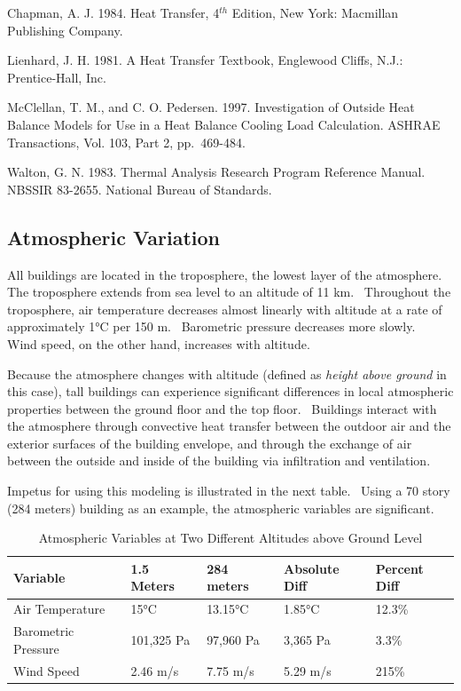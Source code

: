 Chapman, A. J. 1984. Heat Transfer, 4\(^{th}\) Edition, New York: Macmillan Publishing Company.

Lienhard, J. H. 1981. A Heat Transfer Textbook, Englewood Cliffs, N.J.: Prentice-Hall, Inc.

McClellan, T. M., and C. O. Pedersen. 1997. Investigation of Outside Heat Balance Models for Use in a Heat Balance Cooling Load Calculation. ASHRAE Transactions, Vol. 103, Part 2, pp.~469-484.

Walton, G. N. 1983. Thermal Analysis Research Program Reference Manual. NBSSIR 83-2655. National Bureau of Standards.

\subsection{Atmospheric Variation}\label{atmospheric-variation}

All buildings are located in the troposphere, the lowest layer of the atmosphere.~ The troposphere extends from sea level to an altitude of 11 km.~ Throughout the troposphere, air temperature decreases almost linearly with altitude at a rate of approximately 1°C per 150 m.~ Barometric pressure decreases more slowly.~ Wind speed, on the other hand, increases with altitude.

Because the atmosphere changes with altitude (defined as \emph{height above ground} in this case), tall buildings can experience significant differences in local atmospheric properties between the ground floor and the top floor. ~Buildings interact with the atmosphere through convective heat transfer between the outdoor air and the exterior surfaces of the building envelope, and through the exchange of air between the outside and inside of the building via infiltration and ventilation.

Impetus for using this modeling is illustrated in the next table.~ Using a 70 story (284 meters) building as an example, the atmospheric variables are significant.

\begin{longtable}[c]{@{}lllll@{}}
\caption{Atmospheric Variables at Two Different Altitudes above Ground Level \label{table:atmospheric-variables-at-two-different}} \tabularnewline
\toprule 
Variable & 1.5 Meters & 284 meters & Absolute Diff & Percent Diff \tabularnewline \midrule
\endhead

Air Temperature & 15°C & 13.15°C & 1.85°C & 12.3\% \tabularnewline
Barometric Pressure & 101,325 Pa & 97,960 Pa & 3,365 Pa & 3.3\% \tabularnewline
Wind Speed & 2.46 m/s & 7.75 m/s & 5.29 m/s & 215\% \tabularnewline
\bottomrule
\end{longtable}

